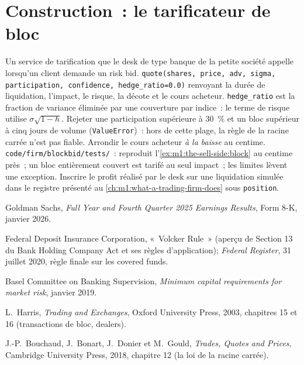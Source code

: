 \section{Construction~: le tarificateur de bloc}\label{bld:m1:the-sell-side:blockbid}

\begin{build}
 Un service de tarification que le desk de type banque de la petite société
appelle lorsqu'un client demande un risk bid.  \texttt{quote(shares, price, adv, sigma, participation,
confidence, hedge\_ratio=0.0)} renvoyant la durée de liquidation, l'impact, le risque,
la décote et le cours acheteur. \texttt{hedge\_ratio} est la fraction de variance
éliminée par une couverture par indice~: le terme de risque utilise $\sigma\sqrt{1-h}$.
 Rejeter une participation supérieure à 30~\% et un bloc supérieur à cinq
jours de volume (\texttt{ValueError})~: hors de cette plage, la règle de la racine carrée
n'est pas fiable. Arrondir le cours acheteur \emph{à la baisse} au centime.
 \texttt{code/firm/blockbid/tests/}~: reproduit
l'\cref{ex:m1:the-sell-side:block} au centime près~; un bloc entièrement couvert est tarifé
au seul impact~; les limites lèvent une exception.
 Inscrire le profit réalisé par le desk sur une liquidation simulée
dans le registre présenté au \cref{ch:m1:what-a-trading-firm-does} sous \texttt{position}.
\end{build}

\begin{omsources}
\item Goldman Sachs, \emph{Full Year and Fourth Quarter 2025 Earnings
Results}, Form 8-K, janvier 2026.
\item Federal Deposit Insurance Corporation, «~Volcker Rule~» (aperçu de
Section 13 du Bank Holding Company Act et ses règles d'application);
\emph{Federal Register}, 31 juillet 2020, règle finale sur les covered funds.
\item Basel Committee on Banking Supervision, \emph{Minimum capital
requirements for market risk}, janvier 2019.
\item L.~Harris, \emph{Trading and Exchanges}, Oxford University Press, 2003,
chapitres 15 et 16 (transactions de bloc, dealers).
\item J.-P.~Bouchaud, J.~Bonart, J.~Donier et M.~Gould, \emph{Trades, Quotes
and Prices}, Cambridge University Press, 2018, chapitre 12 (la loi de la
racine carrée).
\end{omsources}

